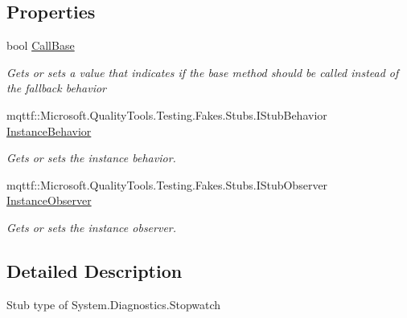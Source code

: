 \subsection*{Properties}
\begin{DoxyCompactItemize}
\item 
bool \hyperlink{class_system_1_1_diagnostics_1_1_fakes_1_1_stub_stopwatch_ad367e29f7339ff8347cec8a043f38c06}{Call\-Base}
\begin{DoxyCompactList}\small\item\em Gets or sets a value that indicates if the base method should be called instead of the fallback behavior\end{DoxyCompactList}\item 
mqttf\-::\-Microsoft.\-Quality\-Tools.\-Testing.\-Fakes.\-Stubs.\-I\-Stub\-Behavior \hyperlink{class_system_1_1_diagnostics_1_1_fakes_1_1_stub_stopwatch_a52d4d8afcaa7985a187478fd05a6d057}{Instance\-Behavior}
\begin{DoxyCompactList}\small\item\em Gets or sets the instance behavior.\end{DoxyCompactList}\item 
mqttf\-::\-Microsoft.\-Quality\-Tools.\-Testing.\-Fakes.\-Stubs.\-I\-Stub\-Observer \hyperlink{class_system_1_1_diagnostics_1_1_fakes_1_1_stub_stopwatch_a76018a1e27d81d0cc65fe51bc74afc1a}{Instance\-Observer}
\begin{DoxyCompactList}\small\item\em Gets or sets the instance observer.\end{DoxyCompactList}\end{DoxyCompactItemize}


\subsection{Detailed Description}
Stub type of System.\-Diagnostics.\-Stopwatch



